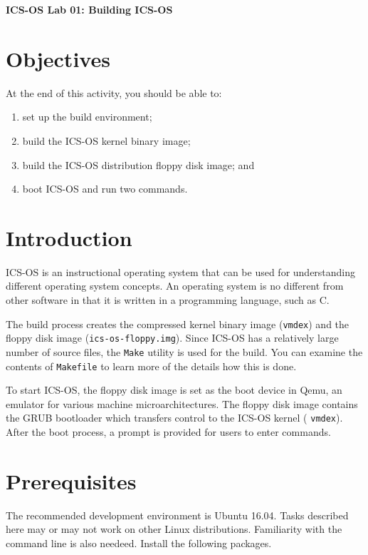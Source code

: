 \documentclass[a4paper, 11pt,oneside]{article}
\begin{document}
\begin{center}
	{\LARGE \textbf{ICS-OS Lab 01: Building ICS-OS}}
\end{center}

\section*{Objectives}
   At the end of this activity, you should be able to:
   \begin{enumerate}[itemsep=0pt,parsep=0pt]
   	   \item set up the build environment;
       \item build the ICS-OS kernel binary image;
       \item build the ICS-OS distribution floppy disk image; and
       \item boot ICS-OS and run two commands.
   \end{enumerate}   

\section{Introduction}
ICS-OS is an instructional operating system that can be used for understanding different operating system concepts.  An operating system is no different from other software in that it is written in a programming language, such as C. 

The build process creates the compressed kernel binary image (\texttt{vmdex}) and the floppy disk image (\texttt{ics-os-floppy.img}). Since ICS-OS has a relatively large number of source files, 
the \texttt{Make} utility is used for the build. You can examine the contents of \texttt{Makefile} 
to learn more of the details how this is done.

To start ICS-OS, the floppy disk image is set as the boot device in Qemu,  
an emulator for various machine microarchitectures. The floppy disk image 
contains the GRUB bootloader which transfers control to the ICS-OS kernel ( 
\texttt{vmdex}). After the boot process, a prompt is provided for users to 
enter commands. 

\section{Prerequisites}
The recommended development environment is Ubuntu 16.04. Tasks described here 
may or may not work on other Linux distributions. Familiarity with the command 
line is also needeed. Install the following packages.
\end{document}
